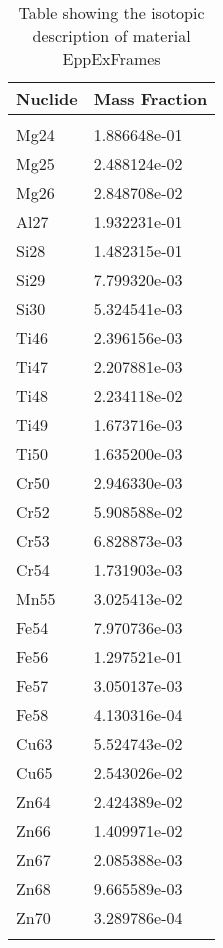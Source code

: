 \begin{centering}
\begin{longtable}[ht!]
\caption{Table showing the isotopic description of material UPTRAP}
\label{table:material_UPTRAP}
\end{longtable}\clearpage

\begin{longtable}[ht!]
{ p{} | p{} }
\hline
Nuclide & Mass Fraction\\
\hline
\\
Mg24 & 1.886648e-01\\
Mg25 & 2.488124e-02\\
Mg26 & 2.848708e-02\\
Al27 & 1.932231e-01\\
Si28 & 1.482315e-01\\
Si29 & 7.799320e-03\\
Si30 & 5.324541e-03\\
Ti46 & 2.396156e-03\\
Ti47 & 2.207881e-03\\
Ti48 & 2.234118e-02\\
Ti49 & 1.673716e-03\\
Ti50 & 1.635200e-03\\
Cr50 & 2.946330e-03\\
Cr52 & 5.908588e-02\\
Cr53 & 6.828873e-03\\
Cr54 & 1.731903e-03\\
Mn55 & 3.025413e-02\\
Fe54 & 7.970736e-03\\
Fe56 & 1.297521e-01\\
Fe57 & 3.050137e-03\\
Fe58 & 4.130316e-04\\
Cu63 & 5.524743e-02\\
Cu65 & 2.543026e-02\\
Zn64 & 2.424389e-02\\
Zn66 & 1.409971e-02\\
Zn67 & 2.085388e-03\\
Zn68 & 9.665589e-03\\
Zn70 & 3.289786e-04\\

\caption{Table showing the isotopic description of material EppExFrames}
\label{table:material_EppExFrames}
\end{longtable}\clearpage


\end{centering}

